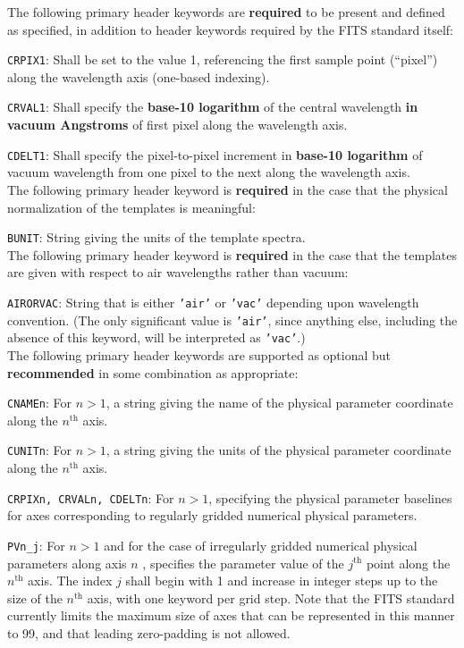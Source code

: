 \documentclass[12pt]{article}
\begin{document}
The following primary header keywords are \textbf{required} to
be present and defined as specified, in addition
to header keywords required by the FITS standard itself:

\noindent \texttt{CRPIX1}: Shall be set to the value 1, referencing the
first sample point (``pixel'') along the wavelength axis (one-based indexing).

\noindent \texttt{CRVAL1}: Shall specify the
\textbf{base-10 logarithm} of the central wavelength
\textbf{in vacuum Angstroms} of first pixel along the wavelength axis.

\noindent \texttt{CDELT1}: Shall specify the pixel-to-pixel
increment in \textbf{base-10 logarithm} of vacuum wavelength from
one pixel to the next along the wavelength axis. \\


The following primary header keyword is \textbf{required} in the
case that the physical normalization of the templates is meaningful:

\noindent \texttt{BUNIT}: String giving the units of the template spectra. \\

The following primary header keyword is \textbf{required} in the
case that the templates are given with respect to air wavelengths
rather than vacuum:

\noindent \texttt{AIRORVAC}: String that is either \texttt{'air'}
or \texttt{'vac'} depending upon wavelength convention.
(The only significant value is \texttt{'air'}, since
anything else, including the absence of this keyword, will
be interpreted as \texttt{'vac'}.) \\

The following primary header keywords are supported as
optional but \textbf{recommended}
in some combination as appropriate:

\noindent \texttt{CNAMEn}: For $n > 1$, a string giving the
name of the physical parameter coordinate along the $n^{\mathrm{th}}$ axis.

\noindent \texttt{CUNITn}: For $n > 1$, a string giving the
units of the physical parameter coordinate along the $n^{\mathrm{th}}$ axis.

\noindent \texttt{CRPIXn, CRVALn, CDELTn}: For $n > 1$, specifying
the physical parameter baselines for axes corresponding to
regularly gridded numerical physical parameters.

\noindent \texttt{PVn\_j}: For $n > 1$ and for the case of irregularly gridded
numerical physical parameters along axis $n$ , specifies the parameter value
of the $j^{\mathrm{th}}$ point along the $n^{\mathrm{th}}$ axis.
The index $j$ shall begin with 1 and increase in integer steps up to the
size of the $n^{\mathrm{th}}$ axis, with one keyword per grid step.
Note that the FITS standard currently limits the maximum size of axes
that can be represented in this manner to 99, and that leading zero-padding
is not allowed.
\end{document}
